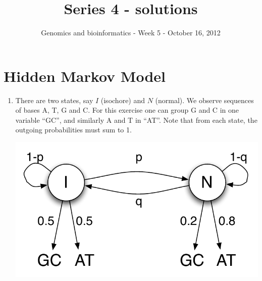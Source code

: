 \documentclass[a4paper,11pt]{article}
\title{Series 4 - solutions}
\date{}
\author{Genomics and bioinformatics - Week 5 - October 16, 2012}
\begin{document}
\maketitle

\section{Hidden Markov Model}
\begin{enumerate}
\item There are two states, say $I$ (isochore) and $N$ (normal). We observe sequences of bases A, T, G and C. For this exercise one can group G and C in one variable ``GC'', and similarly A and T in ``AT''. Note that from each state, the outgoing probabilities must sum to 1.

\begin{center}
\includegraphics[height=0.2\textwidth]{hmm.pdf}
\end{center}


\end{enumerate}
\end{document}
